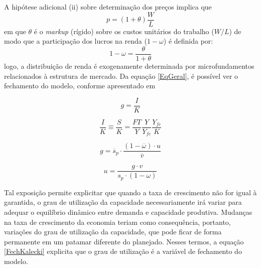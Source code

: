 A hipótese adicional (ii) sobre determinação dos preços implica que 
$$
p = (1+\theta)\frac{W}{L}
$$
em que $\theta$ é o \textit{markup} (rígido) sobre os custos unitários do trabalho ($W/L$) de modo que a participação dos lucros na renda ($1-\omega$) é definida por:
$$
1 - \omega = \frac{\theta}{1+\theta}
$$
logo, a distribuição de renda é exogenamente determinada por microfundamentos relacionados à estrutura de mercado. 
Da equação \ref{EqGeral}, é possível ver o fechamento do modelo, conforme apresentado em \textcite{serrano_trouble_2017}

$$
g = \frac{I}{K}
$$

$$
\frac{I}{K} \equiv \frac{S}{K} =  \frac{FT}{Y}\frac{Y}{Y_{fc}}\frac{Y_{fc}}{K}
$$

$$
g = \overline s_p\cdot \frac{(1-\overline\omega)\cdot u}{\overline v}
$$

\begin{equation}
\label{FechKalecki}
u = \frac{g\cdot v}{s_p\cdot (1-\omega)}
\end{equation}

Tal exposição permite explicitar que quando a taxa de crescimento não for igual à garantida, o grau de utilização da capacidade necessariamente irá variar para adequar o equilíbrio dinâmico entre demanda e capacidade produtiva.
Mudanças na taxa de crescimento da economia teriam como consequência, portanto, variações do grau de utilização da capacidade, que pode ficar de forma permanente em um patamar diferente do planejado.
Nesses termos, a equação \ref{FechKalecki} explicita que o grau de utilização é a variável de fechamento do modelo.

